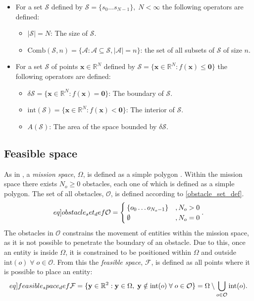 \begin{itemize}
  \item For a set $\mathcal{S}$ defined by $\mathcal{S} = \{s_{0}\hdots s_{N-1}\},\;N<\infty$ the following operators are defined:
  \begin{itemize}
    \item $|\mathcal{S}| = N$: The size of $\mathcal{S}$.
    \item $\mathrm{Comb}(\mathcal{S}, n) = \{\mathcal{A}: \mathcal{A}\subseteq\mathcal{S}, |\mathcal{A}|=n\}$: the set of all subsets of $\mathcal{S}$ of size $n$.
  \end{itemize}
  \item For a set $\mathcal{S}$ of points $\mathbf{x}\in\mathbb{R}^{N}$ defined by $\mathcal{S} = \{\mathbf{x}\in\mathbb{R}^{N}: f(\mathbf{x})\leq\mathbf{0}\}$ the following operators are defined:
  \begin{itemize}
    \item $\delta\mathcal{S} = \{\mathbf{x}\in\mathbb{R}^{N}: f(\mathbf{x}) = \mathbf{0}\}$: The boundary of $\mathcal{S}$.
    \item $\mathrm{int}(\mathcal{S}) = \{\mathbf{x}\in\mathbb{R}^{N}: f(\mathbf{x}) < \mathbf{0}\}$: The interior of $\mathcal{S}$.
    \item $A(\mathcal{S})$: The area of the space bounded by $\delta\mathcal{S}$.
  \end{itemize}
\end{itemize}
\clearpage

\subsection{Feasible space}
As in \cite{sun2014escaping}, a \textit{mission space}, $\Omega$, is defined as a simple polygon 
\cite{weissteinsimplepolygon}.
Within the mission space there exists $N_{o}\geq 0$ obstacles, each one of which is defined as a simple polygon.
The set of all obstacles, $\mathcal{O}$, is defined according to \eqref{obstacle_set_def}.
\begin{equation}\label[eq]{obstacle_set_def}
  \mathcal{O} = \begin{cases}
    \{o_{0}\hdots o_{N_{o}-1}\} &, N_{o} > 0\\
    \emptyset &, N_{o} = 0\\
  \end{cases}.
\end{equation}
The obstacles in $\mathcal{O}$ constrains the movement of entities within the mission space, as it is not possible to
penetrate the boundary of an obstacle. Due to this, once an entity is inside $\Omega$, it is constrained to be positioned within
$\Omega$ and outside $\mathrm{int}(o)\;\forall\;o\in\mathcal{O}$. From this the \textit{feasible space}, $\mathcal{F}$, is defined as
all points where it is possible to place an entity:
\begin{equation}\label[eq]{feasible_space_def}
  \mathcal{F} = \{\mathbf{y}\in\mathbb{R}^{2}: \mathbf{y}\in\Omega,\;\mathbf{y}\notin\mathrm{int}(o)\;\forall\;o\in\mathcal{O}\} = \Omega\setminus\bigcup_{o\in\mathcal{O}}\mathrm{int}(o).
\end{equation}

